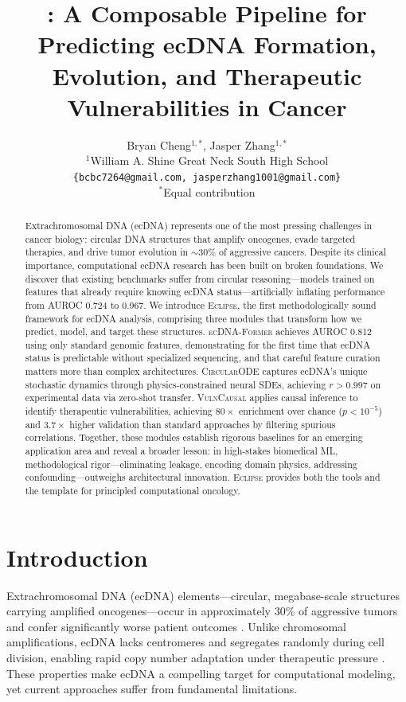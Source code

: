 \documentclass{article}
\title{\eclipse{}: A Composable Pipeline for Predicting ecDNA Formation, Evolution, and Therapeutic Vulnerabilities in Cancer}
\author{Bryan Cheng$^{1,*}$, Jasper Zhang$^{1,*}$ \\
$^{1}$William A. Shine Great Neck South High School \\
\texttt{\{bcbc7264@gmail.com, jasperzhang1001@gmail.com\}} \\
$^{*}$Equal contribution
}
\newcommand{\eclipse}{\textsc{Eclipse}}
\newcommand{\former}{\textsc{ecDNA-Former}}
\newcommand{\circularode}{\textsc{CircularODE}}
\newcommand{\vulncausal}{\textsc{VulnCausal}}
\begin{document}
\maketitle
{}

\begin{abstract}
Extrachromosomal DNA (ecDNA) represents one of the most pressing challenges in cancer biology: circular DNA structures that amplify oncogenes, evade targeted therapies, and drive tumor evolution in $\sim$30\% of aggressive cancers. Despite its clinical importance, computational ecDNA research has been built on broken foundations. We discover that existing benchmarks suffer from circular reasoning---models trained on features that already require knowing ecDNA status---artificially inflating performance from AUROC 0.724 to 0.967. We introduce \eclipse{}, the first methodologically sound framework for ecDNA analysis, comprising three modules that transform how we predict, model, and target these structures. \former{} achieves AUROC 0.812 using only standard genomic features, demonstrating for the first time that ecDNA status is predictable without specialized sequencing, and that careful feature curation matters more than complex architectures. \circularode{} captures ecDNA's unique stochastic dynamics through physics-constrained neural SDEs, achieving $r > 0.997$ on experimental data via zero-shot transfer. \vulncausal{} applies causal inference to identify therapeutic vulnerabilities, achieving $80\times$ enrichment over chance ($p < 10^{-5}$) and $3.7\times$ higher validation than standard approaches by filtering spurious correlations. Together, these modules establish rigorous baselines for an emerging application area and reveal a broader lesson: in high-stakes biomedical ML, methodological rigor---eliminating leakage, encoding domain physics, addressing confounding---outweighs architectural innovation. \eclipse{} provides both the tools and the template for principled computational oncology.
\end{abstract}


\section{Introduction}
\label{sec:intro}

Extrachromosomal DNA (ecDNA) elements---circular, megabase-scale structures carrying amplified oncogenes---occur in approximately 30\% of aggressive tumors and confer significantly worse patient outcomes \citep{kim_2020_ecdna_prognosis}. Unlike chromosomal amplifications, ecDNA lacks centromeres and segregates randomly during cell division, enabling rapid copy number adaptation under therapeutic pressure \citep{nathanson_2014_targeted, lange_2022_mathematical}. These properties make ecDNA a compelling target for computational modeling, yet current approaches suffer from fundamental limitations.
\end{document}

